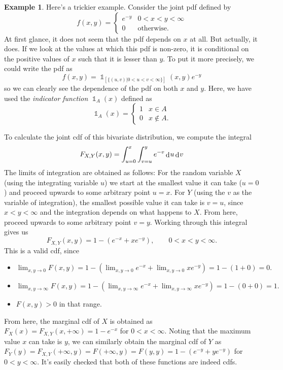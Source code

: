 \documentclass[
]{book}
\providecommand{\tightlist}{%
  \setlength{\itemsep}{0pt}\setlength{\parskip}{0pt}}
\DeclareMathOperator{\ind}{\mathds{1}}
\DeclareMathOperator{\dd}{d}
\newcommand{\dint}{\dd\hspace{0.5pt}\!}
\theoremstyle{definition}
\theoremstyle{definition}
\newtheorem{example}{Example}[chapter]
\theoremstyle{definition}
\theoremstyle{definition}
\theoremstyle{remark}
\begin{document}
\begin{example}
Here's a trickier example.
Consider the joint pdf defined by
\[
f(x,y) = \begin{cases}
e^{-y} & 0<x<y<\infty \\
0 & \text{otherwise.}
\end{cases}
\]
At first glance, it does not seem that the pdf depends on \(x\) at all.
But actually, it does.
If we look at the values at which this pdf is non-zero, it is conditional on the positive values of \(x\) such that it is lesser than \(y\).
To put it more precisely, we could write the pdf as
\[
f(x,y) = \ind_{[\{(u,v) | 0<u<v<\infty\}]}(x,y) e^{-y}
\]
so we can clearly see the dependence of the pdf on both \(x\) and \(y\).
Here, we have used the \emph{indicator function} \(\ind_A(x)\) defined as
\[
\ind_A(x) = \begin{cases}
1 & x\in A \\
0 & x\not\in A.
\end{cases}
\]

To calculate the joint cdf of this bivariate distribution, we compute the integral
\[
F_{X,Y}(x,y) = \int_{u=0}^x \int_{v=u}^y e^{-v} \dint u \dint v 
\]
The limits of integration are obtained as follows: For the random variable \(X\) (using the integrating variable \(u\)) we start at the smallest value it can take (\(u=0\)) and proceed upwards to some arbitrary point \(u=x\). For \(Y\) (using the \(v\) as the variable of integration), the smallest possible value it can take is \(v=u\), since \(x<y<\infty\) and the integration depends on what happens to \(X\). From here, proceed upwards to some arbitrary point \(v=y\).
Working through this integral gives us
\[
F_{X,Y}(x,y) = 1 - (e^{-x}+xe^{-y}), \hspace{2em} 0<x<y<\infty.
\]
This is a valid cdf, since

\begin{itemize}
\tightlist
\item
  \(\lim_{x,y\to 0} F(x,y) = 1-\left(\lim_{x,y\to 0}e^{-x} + \lim_{x,y\to 0} xe^{-y} \right) = 1 - (1 + 0) = 0.\)
\item
  \(\lim_{x,y\to \infty} F(x,y) = 1-\left(\lim_{x,y\to \infty}e^{-x} + \lim_{x,y\to \infty} xe^{-y} \right) = 1 - (0 + 0) = 1.\)
\item
  \(F(x,y)>0\) in that range.
\end{itemize}

From here, the marginal cdf of \(X\) is obtained as \(F_X(x)=F_{X,Y}(x,+\infty)= 1-e^{-x}\) for \(0<x<\infty\).
Noting that the maximum value \(x\) can take is \(y\), we can similarly obtain the marginal cdf of \(Y\) as \(F_Y(y)=F_{X,Y}(+\infty,y) = F(+\infty,y)= F(y,y) = 1-(e^{-y}+ye^{-y})\) for \(0<y<\infty\).
It's easily checked that both of these functions are indeed cdfs.
\end{example}
\end{document}
